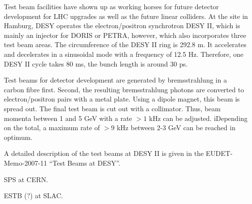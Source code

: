Test beam facilities have shown up as working horses for future detector development for LHC upgrades as well as the future linear colliders.
At the site in Hamburg, DESY operates the electron/positron synchrotron DESY II, which is mainly an injector for DORIS or PETRA, however, which also incorporates three test beam areas. 
The circumference of the DESY II ring is 292.8 m. 
It accelerates and decelerates in a sinusoidal mode with a frequency of 12.5 Hz. 
Therefore, one DESY II cycle takes 80 ms, the bunch length is around 30 ps. 

Test beams for detector development are generated by bremsstrahlung in a carbon fibre first. 
Second, the resulting bremsstrahlung photons are converted to electron/positron pairs with a metal plate. 
Using a dipole magnet, this beam is spread out.
The final test beam is cut out with a collimator. 
Thus, beam momenta between 1 and 5 GeV with a rate $> 1$ kHz can be adjusted. iDepending on the total, a maximum rate of $> 9$ kHz between 2-3 GeV can be reached in optimum.    

A detailed description of the test beams at DESY II is given in the EUDET-Memo-2007-11 ``Test Beams at DESY''. 


SPS at CERN.

ESTB (?) at SLAC.





